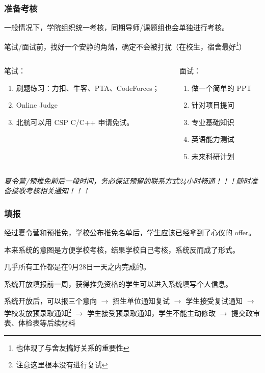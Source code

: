 \begin{frame}
	\frametitle{准备考核}


	一般情况下，学院组织统一考核，同期导师/课题组也会单独进行考核。

	笔试/面试前，找好一个安静的角落，确定不会被打扰（在校生，宿舍最好\footnote{也体现了与舍友搞好关系的重要性}）

	\begin{center}
		\begin{columns}
			\begin{column}{0.4\linewidth}
				笔试：
				\begin{enumerate}
					\item 刷题练习：力扣、牛客、PTA、CodeForces；
					\item Online Judge
					\item 北航可以用 CSP C/C++ 申请免试。
				\end{enumerate}
			\end{column}

			\begin{column}{0.4\linewidth}
				面试：
				\begin{enumerate}
					\item 做一个简单的 PPT
					\item 针对项目提问
					\item 专业基础知识
					\item 英语能力测试
					\item 未来科研计划
				\end{enumerate}
			\end{column}
		\end{columns}
	\end{center}
	\emph{夏令营/预推免前后一段时间，务必保证预留的联系方式24小时畅通！！！随时准备接收考核相关通知！！！}
\end{frame}

\begin{frame}
	\frametitle{填报}

	经过夏令营和预推免，学校公布推免名单后，学生应该已经拿到了心仪的 offer。

	本来系统的意图是方便学校考核，结果学校自己考核，系统反而成了形式。

	几乎所有工作都是在9月28日一天之内完成的。

	系统开放填报前一周，获得推免资格的学生可以进入系统填写个人信息。

	系统开放后，可以报三个意向 $\rightarrow$ 招生单位通知复试 $\rightarrow$ 学生接受复试通知 $\rightarrow$ 学校发放预录取通知\footnote{注意这里根本没有进行复试} $\rightarrow$ 学生接受预录取通知，学生不能主动修改 $\rightarrow$ 提交政审表、体检表等后续材料

\end{frame}

